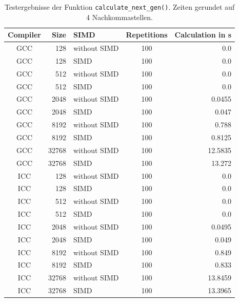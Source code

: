 \documentclass[german,plainarticle,hyperref,utf8]{zihpub}
\begin{document}
	\begin{table}
		\begin{center}
			\begin{tabular}{|| c r l c r ||}
				\hline
				Compiler & Size  & SIMD & Repetitions & Calculation in s \\ [1ex]
				\hline\hline
				GCC & 128 & without SIMD & 100 & 0.0 \\ \hline
				GCC & 128 & SIMD & 100 & 0.0 \\ \hline
				GCC & 512 & without SIMD & 100 & 0.0 \\ \hline
				GCC & 512 & SIMD & 100 & 0.0 \\ \hline
				GCC & 2048 & without SIMD & 100 & 0.0455 \\ \hline
				GCC & 2048 & SIMD & 100 & 0.047 \\ \hline
				GCC & 8192 & without SIMD & 100 & 0.788 \\ \hline
				GCC & 8192 & SIMD & 100 & 0.8125 \\ \hline
				GCC & 32768 & without SIMD & 100 & 12.5835 \\ \hline \hline
				GCC & 32768 & SIMD & 100 & 13.272 \\ \hline
				ICC & 128 & without SIMD & 100 & 0.0 \\ \hline
				ICC & 128 & SIMD & 100 & 0.0 \\ \hline
				ICC & 512 & without SIMD & 100 & 0.0 \\ \hline
				ICC & 512 & SIMD & 100 & 0.0 \\ \hline
				ICC & 2048 & without SIMD & 100 & 0.0495 \\ \hline
				ICC & 2048 & SIMD & 100 & 0.049 \\ \hline
				ICC & 8192 & without SIMD & 100 & 0.849 \\ \hline
				ICC & 8192 & SIMD & 100 & 0.833 \\ \hline
				ICC & 32768 & without SIMD & 100 & 13.8459 \\ \hline
				ICC & 32768 & SIMD & 100 & 13.3965 \\ \hline
			\end{tabular}
			\caption{\label{tab:calc}Testergebnisse der Funktion \texttt{calculate\_next\_gen()}. Zeiten gerundet auf 4 Nachkommastellen.}
		\end{center}
	\end{table}
	\clearpage
	
\end{document}
